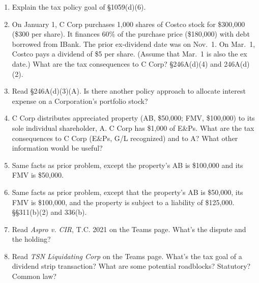 \documentclass[12pt]{article}
\begin{document}
\begin{enumerate}
	\item Explain the tax policy goal of \S1059(d)(6).
	
	\item On January 1, C Corp purchases 1,000 shares of Costco stock for \$300,000 (\$300 per share).  It finances 60\% of the purchase price (\$180,000) with debt borrowed from IBank.  The prior ex-dividend date was on Nov.\ 1.  On Mar.\ 1, Costco pays a dividend of \$5 per share.  (Assume that Mar.\ 1 is also the ex date.)  What are the tax consequences to C Corp? \S246A(d)(4) and 246A(d)(2).

	\item Read \S246A(d)(3)(A).  Is there another policy approach to allocate interest expense on a Corporation's portfolio stock? 
	
	
	\item C Corp distributes appreciated property (AB, \$50,000; FMV, \$100,000) to its sole individual shareholder, A.  C Corp has \$1,000 of E\&Ps.  What are the tax consequences to C Corp (E\&Ps, G/L recognized) and to A? What other information would be useful?

	\item Same facts as prior problem, except the property's AB is \$100,000 and its FMV is \$50,000.
	
	\item Same facts as prior problem, except that the property's AB is \$50,000, its FMV is \$100,000, and the property is subject to a liability of \$125,000.  \S\S311(b)(2) and 336(b).

	\item Read \emph{Aspro v. CIR}, T.C. 2021 on the Teams page.  What's the dispute and the holding?
	
	\item Read \emph{TSN Liquidating Corp} on the Teams page.  What's the tax goal of a dividend strip transaction?  What are some potential roadblocks?  Statutory? Common law?
	\end{enumerate}
	
	






	
\end{document}

